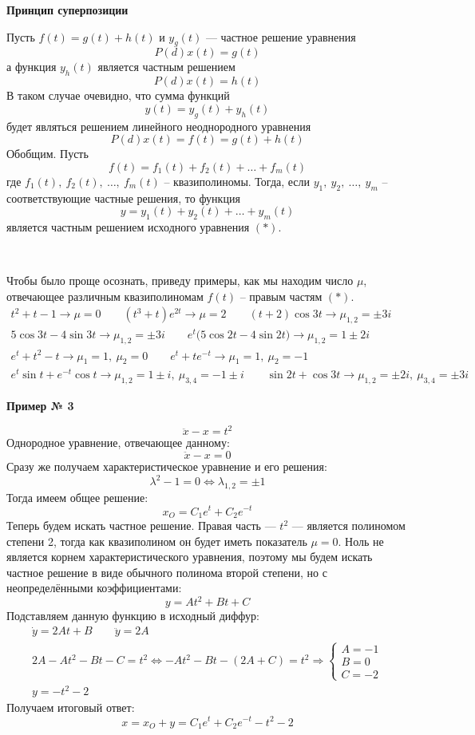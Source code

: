 \documentclass[a4paper,12pt]{article}
\newcommand{\dy}{\dot{y}}
\newcommand{\ddy}{\ddot{y}}
\newcommand{\ddx}{\ddot{x}}
\renewcommand{\to}{\longrightarrow}
\newcommand{\bto}{\Longrightarrow}
\begin{document}
\textbf{Принцип суперпозиции}

Пусть $f(t) = g(t) + h(t)$ и $y_g(t)$ --- частное решение уравнения
\[P(d)x(t) = g(t)\]
а функция $y_h(t)$ является частным решением 
\[P(d)x(t) = h(t)\]
В таком случае очевидно, что сумма функций
\[y(t) = y_g(t) + y_h(t)\]
будет являться решением линейного неоднородного уравнения
\[P(d)x(t) = f(t) = g(t) + h(t)\]
Обобщим. 
Пусть
\[f(t) = f_1(t) + f_2(t) + \ldots + f_m(t)\] где $f_1(t),\ f_2(t),\ \ldots,\ f_m(t)$ -- квазиполиномы. 
Тогда, если $y_1,\ y_2,\ \ldots,\ y_m$ -- соответствующие частные решения, то функция
\[y = y_1(t) + y_2(t) + \ldots + y_m(t)\]
является частным решением исходного уравнения $(*)$.
\ 

\ 

Чтобы было проще осознать, приведу примеры, как мы находим число $\mu$, отвечающее различным квазиполиномам $f(t)$ -- правым частям $(*)$.
\begin{gather*}
t^2 + t - 1 \to \mu = 0 \qquad (t^3 + t)e^{2t} \to \mu = 2 \qquad (t + 2)\cos 3t \to \mu_{1,2} = \pm 3i\\
5\cos 3t - 4\sin 3t \to \mu_{1,2} = \pm 3i \qquad e^{t}\big(5\cos 2t - 4\sin 2t\big) \to \mu_{1,2} = 1 \pm 2i \\
e^t + t^2 - t  \to \mu_1 = 1,\ \mu_2  = 0\qquad e^t + te^{-t} \to \mu_1 = 1,\ \mu_2 = -1\\
e^t\sin t + e^{-t}\cos t \to \mu_{1,2} = 1 \pm i,\ \mu_{3,4} = -1 \pm i\qquad \sin 2t + \cos 3t \to \mu_{1,2} = \pm 2i,\ \mu_{3,4} = \pm 3i
\end{gather*}

\textbf{Пример № 3}

\[\ddx - x  = t^2\]
Однородное уравнение, отвечающее данному:
\[\ddx - x = 0 \]
Сразу же получаем характеристическое уравнение  и его решения:
\[\lambda^2 - 1 = 0 \iff \lambda_{1,2} = \pm 1\]
Тогда имеем общее решение:
\[x_O = C_1e^t + C_2e^{-t}\]
Теперь будем искать частное решение.
Правая часть --- $t^2$ --- является полиномом степени 2, тогда как квазиполином он будет иметь показатель $\mu = 0$.
Ноль не является корнем характеристического уравнения, поэтому мы будем искать частное решение в виде обычного полинома второй степени, но с неопределёнными коэффициентами:
\[y = At^2 + Bt + C\]
Подставляем данную функцию в исходный диффур:
\begin{gather*}
	\dy = 2At + B \qquad \ddy = 2A\\
	2A - At^2 - Bt - C = t^2 \iff -At^2 - Bt - (2A + C) = t^2 \bto \begin{cases}
		A = -1\\
		B = 0\\
		C = -2
	\end{cases}\\
	y = -t^2 - 2
\end{gather*}
Получаем итоговый ответ:
\[x = x_O + y =  C_1e^t + C_2e^{-t} - t^2 - 2\]
\end{document}
